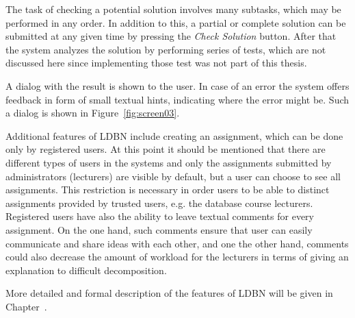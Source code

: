 The task of checking a potential solution
involves many subtasks, which may be performed in any order. In addition to this,  
a partial or complete 
solution can be submitted at any given time by pressing the \textit{Check Solution} button. 
After that the system analyzes the solution by performing series of tests, which are not
discussed here since implementing those test was not part of this thesis. 

A dialog with the result is shown to the user. In case of an error the system offers
feedback in form of small textual hints, indicating
where the error might be. Such a dialog is shown in Figure~\ref{fig:screen03}. 

Additional features of LDBN include creating an assignment, which can be done 
only by registered users. At this point it should be mentioned that
there are different types of users in the systems and only the assignments
submitted by administrators (lecturers) are visible by default, but a user can
choose to see all assignments. This restriction is necessary in order users to be able 
to distinct assignments provided by trusted users, e.g. the database course
lecturers. Registered users have also the ability to leave textual comments 
for every assignment. On the one hand, such
comments ensure that user can easily communicate and share ideas
with each other, and one the other hand, comments could also decrease the amount of workload
for the lecturers in terms of giving an explanation to difficult decomposition.

More detailed and formal description of the features of LDBN will be given in
Chapter~\cite{chap:motivation}. 

